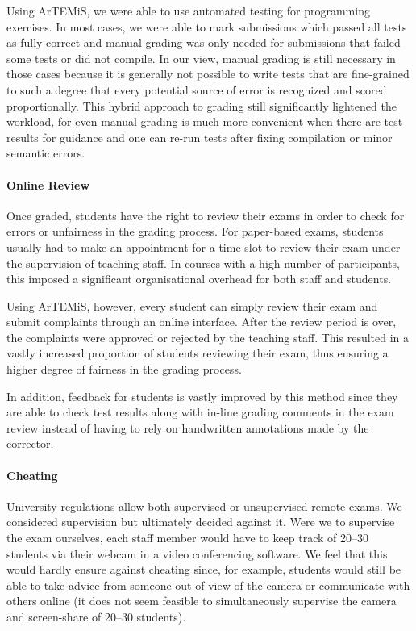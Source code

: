 Using ArTEMiS, we were able to use automated testing for programming exercises.
In most cases, we were able to mark submissions which passed all tests as fully correct
and manual grading was only needed for submissions that failed some tests or did not compile.
In our view, manual grading is still necessary in those cases because it is generally not possible to write tests that are fine-grained to such a degree that every potential source of error is recognized and scored proportionally.
This hybrid approach to grading still significantly lightened the workload, for even manual grading is much more convenient when there are test results for guidance and one can re-run tests after fixing compilation or minor semantic errors.

\paragraph{Online Review}

Once graded, students have the right to review their
exams in order to check for errors or unfairness in the grading process.
For paper-based exams, students usually had to make an
appointment for a time-slot to review their exam under
the supervision of teaching staff.
In courses with a high number of participants, this imposed a significant organisational overhead for both staff and students.

Using ArTEMiS, however, every student can simply review their exam and submit complaints through an online interface.
After the review period is over,
the complaints were approved or rejected by the teaching staff.
This resulted in a vastly increased proportion of students reviewing their exam,
thus ensuring a higher degree of fairness in the grading process.

In addition, feedback for students is vastly improved by this method since they are able to check test results along with in-line grading comments in the exam review instead of having to rely on handwritten annotations made by the corrector.

\paragraph{Cheating}

University regulations allow both supervised or unsupervised remote exams.
We considered supervision but ultimately decided against it. Were we to supervise the exam ourselves,
each staff member would have to keep track of 20--30 students via their webcam in a video conferencing software.
We feel that this would hardly ensure against cheating
since, for example, students would still be able to take advice from someone out of view of the camera or communicate with others online (it does not seem feasible to simultaneously supervise the camera and screen-share of 20--30 students).

